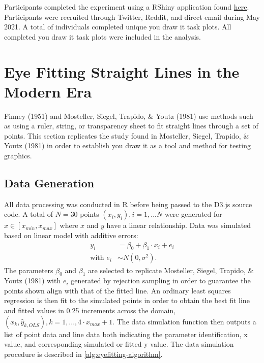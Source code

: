 \documentclass[print]{nuthesis}
\begin{document}
Participants completed the experiment using a RShiny application found \href{https://shiny.srvanderplas.com/you-draw-it/}{here}.
Participants were recruited through Twitter, Reddit, and direct email during May 2021.
A total of  individuals completed  unique you draw it task plots.
All completed you draw it task plots were included in the analysis.

\hypertarget{eye-fitting-straight-lines-in-the-modern-era}{%
\section{Eye Fitting Straight Lines in the Modern Era}\label{eye-fitting-straight-lines-in-the-modern-era}}

Finney (1951) and Mosteller, Siegel, Trapido, \& Youtz (1981) use methods such as using a ruler, string, or transparency sheet to fit straight lines through a set of points.
This section replicates the study found in Mosteller, Siegel, Trapido, \& Youtz (1981) in order to establish you draw it as a tool and method for testing graphics.

\hypertarget{data-generation-1}{%
\subsection{Data Generation}\label{data-generation-1}}

All data processing was conducted in R before being passed to the D3.js source code.
A total of \(N = 30\) points \((x_i, y_i), i = 1,...N\) were generated for \(x\in [x_{min}, x_{max}]\) where \(x\) and \(y\) have a linear relationship.
Data was simulated based on linear model with additive errors:
\begin{align}
y_i & = \beta_0 + \beta_1 \cdot x_i + e_i \\
\text{with } e_i & \sim N(0, \sigma^2). \nonumber
\end{align}
The parameters \(\beta_0\) and \(\beta_1\) are selected to replicate Mosteller, Siegel, Trapido, \& Youtz (1981) with \(e_i\) generated by rejection sampling in order to guarantee the points shown align with that of the fitted line.
An ordinary least squares regression is then fit to the simulated points in order to obtain the best fit line and fitted values in 0.25 increments across the domain, \((x_k, \hat y_{k,OLS}), k = 1, ..., 4\cdot x_{max} +1\).
The data simulation function then outputs a list of point data and line data both indicating the parameter identification, x value, and corresponding simulated or fitted y value.
The data simulation procedure is described in \cref{alg:eyefitting-algorithm}.
\end{document}
